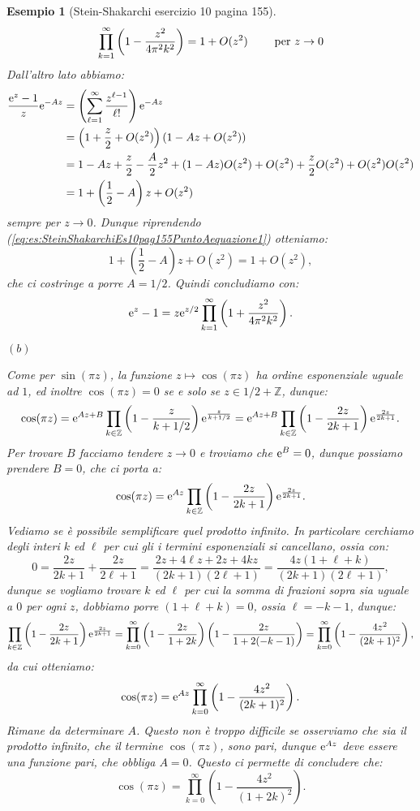 \documentclass[11pt]{book}
\theoremstyle{Definizione}
\theoremstyle{TeoremaProposizioneLemmaCorollarioCongettura}
\theoremstyle{OsservazioneNotaEsempio}
\newtheorem{myes}{Esempio}[section]
\newcommand{\Z}{\mathbb{Z}}
\newcommand{\e}{\textup{e}}
\begin{document}
\begin{myes}[Stein-Shakarchi esercizio 10 pagina 155]
$$
\prod_{k = 1}^\infty \left(1-\frac{z^2}{4\pi^2k^2}\right) = 1+ O(z^2) \qquad\textup{ per }z\to 0
$$
Dall'altro lato abbiamo:
\begin{align*}
\frac{\e^{z}-1}{z} \e^{-Az} &= \left(\sum_{\ell = 1}^\infty \frac{z^{\ell-1}}{\ell!}\right)\e^{-Az}\\
&= \left(1+\frac{z}{2}+O(z^2)\right)(1-Az+O(z^2))\\
&= 1-Az+\frac{z}{2}-\frac{A}{2}z^2 +(1-Az)O(z^2)+O(z^2)+\frac{z}{2}O(z^2)+O(z^2)O(z^2)\\
&= 1+\left(\frac{1}{2}-A\right)z+O(z^2)
\end{align*}
sempre per $z \to 0$. Dunque riprendendo (\ref{eq:es:SteinShakarchiEs10pag155PuntoAequazione1}) otteniamo:
$$
1+\left(\frac{1}{2}-A\right)z+O(z^2) = 1+ O(z^2),
$$
che ci costringe a porre $A = 1/2$. Quindi concludiamo con:
$$
\e^{z}-1 = z\e^{z/2} \prod_{k = 1}^\infty \left(1+\frac{z^2}{4\pi^2k^2}\right).
$$
\begin{flushleft}
$(b)$
\end{flushleft}
Come per $\sin(\pi z)$, la funzione $z\mapsto \cos(\pi z)$ ha ordine esponenziale uguale ad $1$, ed inoltre $\cos(\pi z) = 0$ se e solo se $z \in 1/2 +\Z$, dunque:
$$
\cos(\pi z) = \e^{Az+B} \prod_{k\in \Z} \left(1-\frac{z}{k+1/2}\right)\e^{\frac{z}{k+1/2}} = \e^{Az+B} \prod_{k\in \Z} \left(1-\frac{2z}{2k+1}\right)\e^{\frac{2z}{2k+1}}.
$$
Per trovare $B$ facciamo tendere $z \to 0$ e troviamo che $\e^{B} = 0$, dunque possiamo prendere $B = 0$, che ci porta a:
$$
\cos(\pi z) = \e^{Az} \prod_{k\in \Z} \left(1-\frac{2z}{2k+1}\right)\e^{\frac{2z}{2k+1}}.
$$
Vediamo se è possibile semplificare quel prodotto infinito. In particolare cerchiamo degli interi $k$ ed $\ell$ per cui gli i termini esponenziali si cancellano, ossia con:
$$
0 = \frac{2z}{2k+1}+\frac{2z}{2\ell+1} = \frac{2z+4\ell z + 2z +4kz}{(2k+1)(2\ell+1)} = \frac{4z(1+\ell+k)}{(2k+1)(2\ell+1)},
$$
dunque se vogliamo trovare $k$ ed $\ell$ per cui la somma di frazioni sopra sia uguale a $0$ per ogni $z$, dobbiamo porre $(1+\ell+k) = 0$, ossia $\ell = -k-1$, dunque:
$$
\prod_{k\in \Z} \left(1-\frac{2z}{2k+1}\right)\e^{\frac{2z}{2k+1}} = \prod_{k = 0}^\infty \left(1-\frac{2z}{1+2k}\right)\left(1-\frac{2z}{1+2(-k-1)}\right) = \prod_{k = 0}^\infty \left(1-\frac{4z^2}{(2k+1)^2}\right),
$$
da cui otteniamo:
$$
\cos(\pi z) = \e^{Az} \prod_{k = 0}^\infty \left(1-\frac{4z^2}{(2k+1)^2}\right).
$$
Rimane da determinare $A$. Questo non è troppo difficile se osserviamo che sia il prodotto infinito, che il termine $\cos(\pi z)$, sono pari, dunque $\e^{Az}$ deve essere una funzione pari, che obbliga $A = 0$. Questo ci permette di concludere che:
$$
\cos(\pi z) = \prod_{k = 0}^\infty \left(1-\frac{4z^2}{(1+2k)^2}\right).
$$
\end{myes}
\end{document}
